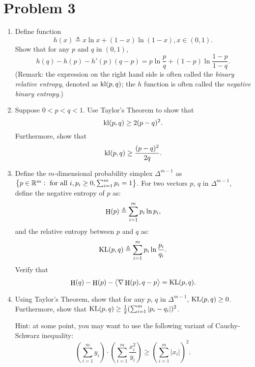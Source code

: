 \documentclass{article}
\DeclareMathOperator*{\kl}{{\rm kl}}
\DeclareMathOperator*{\KL}{{\rm KL}}
\DeclareMathOperator*{\nent}{{\rm H}}
\newcommand{\RR}{\mathbb{R}} %
\newcommand{\defeq}{\triangleq}
\newcommand{\inner}[2]{\left\langle #1,#2 \right\rangle}
\begin{document}
\section*{Problem 3}
\begin{enumerate}
\item Define function
\[ h(x) \defeq x \ln x + (1-x) \ln (1-x), x \in (0,1). \]
Show that for any $p$ and $q$ in $(0,1)$,
\[ h(q) - h(p) - h'(p)(q - p)
   = p \ln \frac{p}{q} + (1-p) \ln \frac{1-p}{1-q}. \]
(Remark: the expression on the right hand side is often called the {\em binary relative
entropy}, denoted as $\kl(p,q)$; the $h$ function is often called the {\em negative
binary entropy}.)

\item Suppose $0 < p < q < 1$.
Use Taylor's Theorem to show that
\[ \kl(p,q) \geq 2(p-q)^2. \]
Furthermore, show that
\[ \kl(p,q) \geq \frac{(p-q)^2}{2q}. \]

\item Define the $m$-dimensional probability simplex
$\Delta^{m-1}$ as $\cbr{p \in \RR^m: \text{ for all } i, p_i \geq 0,
\sum_{i=1}^m p_i = 1}$. For two vectors $p$, $q$ in $\Delta^{m-1}$,
define the negative entropy of $p$ as:
\[ \nent(p) \defeq \sum_{i=1}^m p_i \ln p_i, \]
and the relative entropy between $p$ and $q$ as:
\[ \KL(p, q) \defeq \sum_{i=1}^m p_i \ln \frac{p_i}{q_i}. \]
Verify that
\[ \nent(q) - \nent(p) - \inner{\nabla \nent(p)}{q - p} = \KL(p, q). \]

\item Using Taylor's Theorem, show that for any $p$, $q$ in $\Delta^{m-1}$,
$\KL(p,q) \geq 0$.
Furthermore, show that
$\KL(p,q) \geq \frac{1}{2} (\sum_{i=1}^m |p_i - q_i|)^2$.

Hint: at some point, you may want to use the following variant of Cauchy-Schwarz
inequality:
\[
(\sum_{i=1}^m y_i) \cdot (\sum_{i=1}^m \frac{x_i^2}{y_i}) \geq (\sum_{i=1}^m |x_i|)^2.
\]
\end{enumerate}
\end{document}

